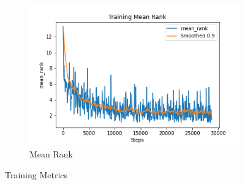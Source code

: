 \begin{figure}[h]
\begin{subfigure}[b]{0.3\textwidth}
         \includegraphics[width=\textwidth]{./figure/results/baseline_and_blindfolding/training/mean_rank.png}
         \caption{Mean Rank}
         \label{fig:training_mean_rank}
     \end{subfigure}
     \caption{Training Metrics}
     \label{fig:training_metrics}
\end{figure}

